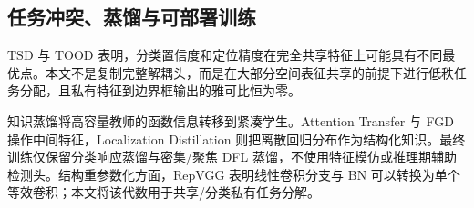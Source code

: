 \subsection{任务冲突、蒸馏与可部署训练}
TSD 与 TOOD 表明，分类置信度和定位精度在完全共享特征上可能具有不同最优点\cite{wu2020tsd,feng2021tood}。本文不是复制完整解耦头，而是在大部分空间表征共享的前提下进行低秩任务分配，且私有特征到边界框输出的雅可比恒为零。

知识蒸馏将高容量教师的函数信息转移到紧凑学生\cite{hinton2015distilling}。Attention Transfer 与 FGD 操作中间特征\cite{zhang2018attentiontransfer,yang2022fgd}，Localization Distillation 则把离散回归分布作为结构化知识\cite{zheng2022ld}。最终训练仅保留分类响应蒸馏与密集/聚焦 DFL 蒸馏，不使用特征模仿或推理期辅助检测头。结构重参数化方面，RepVGG 表明线性卷积分支与 BN 可以转换为单个等效卷积\cite{ding2021repvgg}；本文将该代数用于共享/分类私有任务分解。
